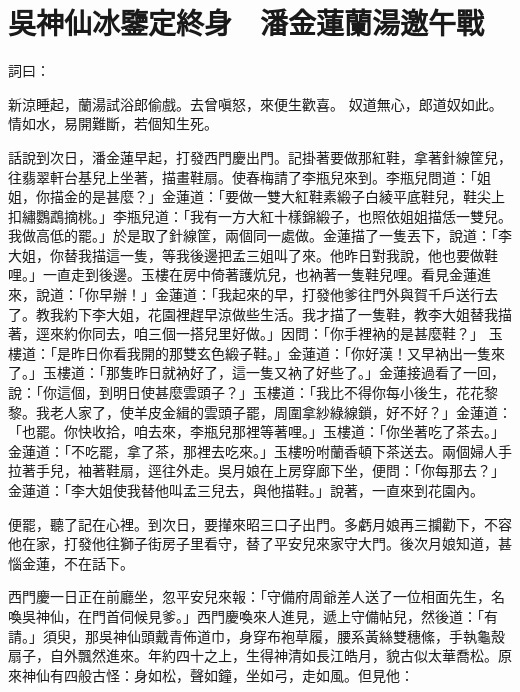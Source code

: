 %

\chapter{吳神仙冰鑒定終身　潘金蓮蘭湯邀午戰}

詞曰：

新涼睡起，蘭湯試浴郎偷戲。去曾嗔怒，來便生歡喜。
奴道無心，郎道奴如此。情如水，易開難斷，若個知生死。

話說到次日，潘金蓮早起，打發西門慶出門。記掛著要做那紅鞋，拿著針線筐兒，往翡翠軒台基兒上坐著，描畫鞋扇。使春梅請了李瓶兒來到。李瓶兒問道：「姐姐，你描金的是甚麼？」金蓮道：「要做一雙大紅鞋素緞子白綾平底鞋兒，鞋尖上扣繡鸚鵡摘桃。」李瓶兒道：「我有一方大紅十樣錦緞子，也照依姐姐描恁一雙兒。我做高低的罷。」於是取了針線筐，兩個同一處做。金蓮描了一隻丟下，說道：「李大姐，你替我描這一隻，等我後邊把孟三姐叫了來。他昨日對我說，他也要做鞋哩。」一直走到後邊。玉樓在房中倚著護炕兒，也衲著一隻鞋兒哩。看見金蓮進來，說道：「你早辦！」金蓮道：「我起來的早，打發他爹往門外與賀千戶送行去了。教我約下李大姐，花園裡趕早涼做些生活。我才描了一隻鞋，教李大姐替我描著，逕來約你同去，咱三個一搭兒里好做。」因問：「你手裡衲的是甚麼鞋？」 玉樓道：「是昨日你看我開的那雙玄色緞子鞋。」金蓮道：「你好漢！又早衲出一隻來了。」玉樓道：「那隻昨日就衲好了，這一隻又衲了好些了。」金蓮接過看了一回，說：「你這個，到明日使甚麼雲頭子？」玉樓道：「我比不得你每小後生，花花黎黎。我老人家了，使羊皮金緝的雲頭子罷，周圍拿紗綠線鎖，好不好？」金蓮道：「也罷。你快收拾，咱去來，李瓶兒那裡等著哩。」玉樓道：「你坐著吃了茶去。」金蓮道：「不吃罷，拿了茶，那裡去吃來。」玉樓吩咐蘭香頓下茶送去。兩個婦人手拉著手兒，袖著鞋扇，逕往外走。吳月娘在上房穿廊下坐，便問：「你每那去？」金蓮道：「李大姐使我替他叫孟三兒去，與他描鞋。」說著，一直來到花園內。

便罷，聽了記在心裡。到次日，要攆來昭三口子出門。多虧月娘再三攔勸下，不容他在家，打發他往獅子街房子里看守，替了平安兒來家守大門。後次月娘知道，甚惱金蓮，不在話下。

西門慶一日正在前廳坐，忽平安兒來報：「守備府周爺差人送了一位相面先生，名喚吳神仙，在門首伺候見爹。」西門慶喚來人進見，遞上守備帖兒，然後道：「有請。」須臾，那吳神仙頭戴青佈道巾，身穿布袍草履，腰系黃絲雙穗絛，手執龜殼扇子，自外飄然進來。年約四十之上，生得神清如長江皓月，貌古似太華喬松。原來神仙有四般古怪：身如松，聲如鐘，坐如弓，走如風。但見他：

